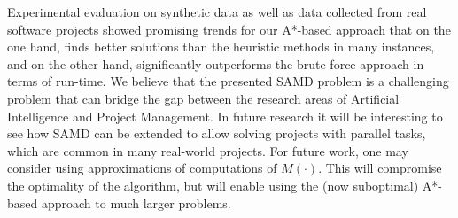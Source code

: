 \documentclass[letterpaper]{article} %
\newcommand{\samd}{\ac{SAMD}\xspace}
\newcommand{\astar}{\textsc{A*}\xspace}
\newcommand{\optapprox}{\textsc{OptApprox}\xspace}
\begin{document}
Experimental evaluation on synthetic data as well as data collected from real software projects showed promising trends for our \astar-based approach that on the one hand, finds better solutions than the heuristic methods in many instances, and on the other hand, significantly outperforms the brute-force approach in terms of run-time. 
We believe that the presented \samd problem is a challenging problem that can bridge the gap between the research areas of Artificial Intelligence and Project Management. In future research it will be interesting to see how \samd can be extended to allow solving projects with parallel tasks, which are common in many real-world projects. 
For future work, one may consider using approximations of computations of $M(\cdot)$. 
This will compromise the optimality of the algorithm, but will enable using the (now suboptimal) \astar-based approach to much larger problems.



\end{document}
